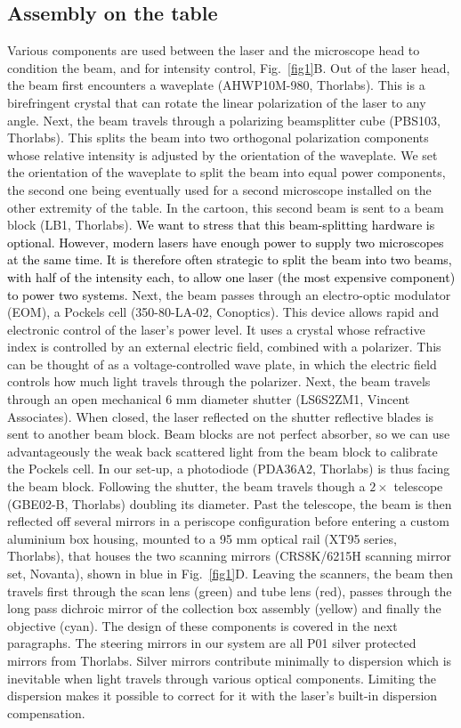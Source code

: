\documentclass[10pt,letterpaper]{article}
\begin{document}
\subsection*{Assembly on the table}
Various components are used between the laser and the microscope head to condition the beam, and  for intensity control, Fig.~\ref{fig1}B. Out of the laser head, the beam first encounters a waveplate (AHWP10M-980, Thorlabs). This is a birefringent crystal that can rotate the linear polarization of the laser to any angle. Next, the beam travels through a polarizing beamsplitter cube (PBS103, Thorlabs). This splits the beam into two orthogonal polarization components whose relative intensity is adjusted by the orientation of the waveplate. We set the orientation of the waveplate to split the beam into equal power components, the second one being eventually used for a second microscope installed on the other extremity of the table. In the cartoon, this second beam is sent to a beam block (LB1, Thorlabs). \textcolor{black}{We want to stress that this beam-splitting hardware is optional. However, modern lasers have enough power to supply two microscopes at the same time. It is therefore often strategic to split the beam into two beams, with half of the intensity each, to allow one laser (the most expensive component) to power two systems.} Next, the beam passes through an electro-optic modulator (EOM), a Pockels cell (350-80-LA-02, Conoptics). This device allows rapid and electronic control of the laser's power level. It uses a crystal whose refractive index is controlled by an external electric field, combined with a polarizer. This can be thought of as a voltage-controlled wave plate, in which the electric field controls how much light travels through the polarizer. Next, the beam travels through an open mechanical 6 mm diameter shutter (LS6S2ZM1, Vincent Associates). When closed, the laser reflected on the shutter reflective blades is sent to another beam block. Beam blocks are not perfect absorber, so we can use advantageously the weak back scattered light from the beam block to calibrate the Pockels cell. In our set-up, a photodiode (PDA36A2, Thorlabs) is thus facing the beam block. Following the shutter, the beam travels though a $2\times$ telescope (GBE02-B, Thorlabs) doubling its diameter. Past the telescope, the beam is then reflected off several mirrors in a periscope configuration before entering a custom aluminium box housing, mounted to a 95 mm optical rail (XT95 series, Thorlabs), that houses the two scanning mirrors (CRS8K/6215H scanning mirror set, Novanta), shown in blue in Fig.~\ref{fig1}D. Leaving the scanners, the beam then travels first through the scan lens (green) and tube lens (red), passes through the long pass dichroic mirror of the collection box assembly (yellow) and finally the objective (cyan). The design of these components is covered in the next paragraphs. The steering mirrors in our system are all P01 silver protected mirrors from Thorlabs. Silver mirrors contribute minimally to dispersion which is inevitable when light travels through various optical components. Limiting the dispersion makes it possible to correct for it with the laser's built-in dispersion compensation. 
\end{document}
